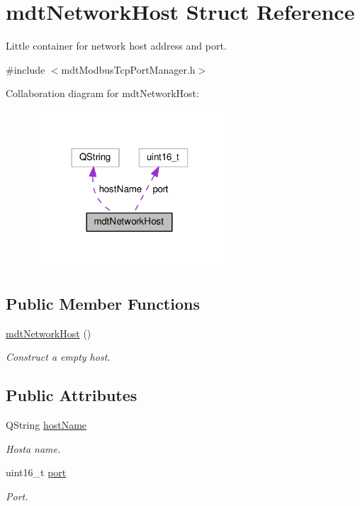 \hypertarget{structmdt_network_host}{\section{mdt\-Network\-Host Struct Reference}
\label{structmdt_network_host}
}


Little container for network host address and port.  




{\ttfamily \#include $<$mdt\-Modbus\-Tcp\-Port\-Manager.\-h$>$}



Collaboration diagram for mdt\-Network\-Host\-:\nopagebreak
\begin{figure}[H]
\begin{center}
\leavevmode
\includegraphics[width=202pt]{structmdt_network_host__coll__graph}
\end{center}
\end{figure}
\subsection*{Public Member Functions}
\begin{DoxyCompactItemize}
\item 
\hyperlink{structmdt_network_host_ad5a36b38053535e05fc605eadb182f61}{mdt\-Network\-Host} ()
\begin{DoxyCompactList}\small\item\em Construct a empty host. \end{DoxyCompactList}\end{DoxyCompactItemize}
\subsection*{Public Attributes}
\begin{DoxyCompactItemize}
\item 
Q\-String \hyperlink{structmdt_network_host_ad3c2f4bfb8b82b2d0f22ef60d7cc9ca2}{host\-Name}
\begin{DoxyCompactList}\small\item\em Hosta name. \end{DoxyCompactList}\item 
uint16\-\_\-t \hyperlink{structmdt_network_host_aa6c1fee525513ea51948add0c1d05034}{port}
\begin{DoxyCompactList}\small\item\em Port. \end{DoxyCompactList}\end{DoxyCompactItemize}


